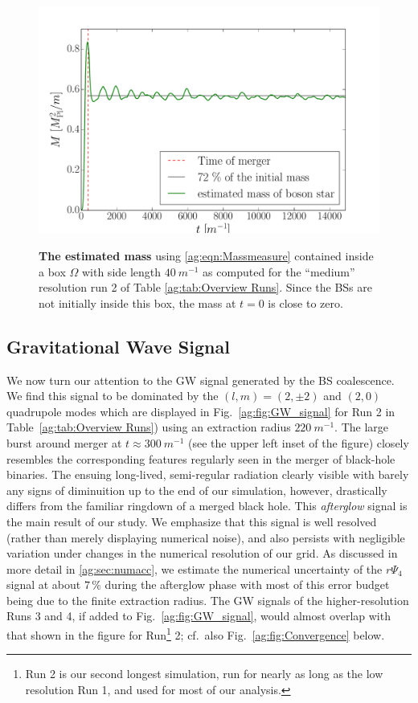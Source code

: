 \begin{figure}[h!]
\begin{center}
    {\includegraphics[width=0.7\columnwidth]{ag_fig/mass_over_time.pdf}}
    \caption{{\bf The estimated mass} using \ref{ag:eqn:Massmeasure}
    contained inside a box $\Omega$ with side length $40~m^{-1}$ as computed for the ``medium''
    resolution run 2 of Table \ref{ag:tab:Overview Runs}.
    Since the BSs are
    not initially inside this box, the mass at $t = 0$ is close to zero.
   }
\label{ag:fig:energy}
\end{center}
\end{figure}







\subsection{Gravitational Wave Signal}\label{ag:sec:GWs}



We now turn our attention to the GW signal generated by the
BS coalescence. We find this signal to be dominated by the
$(l,m)=(2,\pm 2)$ and $(2,0)$ quadrupole modes which are
displayed in Fig.~\ref{ag:fig:GW_signal} for Run 2 in Table~\ref{ag:tab:Overview Runs}) using an extraction
radius $220~m^{-1}$. The large burst around merger at $t\approx300~m^{-1}$ (see the upper left inset of the figure)
closely resembles the corresponding features
regularly seen in the merger of black-hole binaries.
The ensuing long-lived, semi-regular radiation clearly visible
with barely any signs of diminuition up to the end of our
simulation, however, drastically
differs from the familiar ringdown of a merged black hole. This
{\it afterglow} signal is the main result of our study. We
emphasize that this signal is well resolved (rather than
merely displaying numerical noise), and also persists with
negligible variation under changes in the numerical resolution
of our grid. As discussed in more detail in
\ref{ag:sec:numacc}, we estimate the numerical uncertainty
of the $r\Psi_4$ signal at about $7\,\%$ during the afterglow phase
with most of this error budget being due to the finite extraction radius.
The GW signals of the higher-resolution Runs 3 and 4, if added
to Fig.~\ref{ag:fig:GW_signal}, would almost overlap with
that shown in the figure for Run\footnote{Run 2 is our second longest simulation, run for nearly as long as the low resolution Run 1,
and used for most of our analysis.} 2;
cf.~also Fig.~\ref{ag:fig:Convergence} below.


